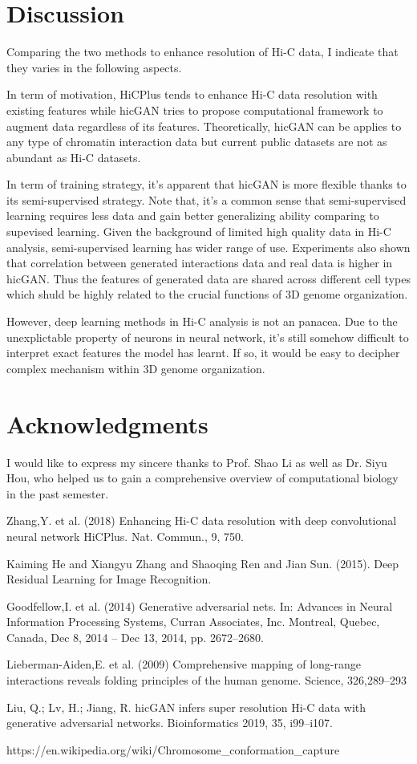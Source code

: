 \documentclass{article}
\begin{document}
\section{Discussion}
Comparing the two methods to enhance resolution of Hi-C data, I indicate that they varies in the following aspects. 

In term of motivation, HiCPlus tends to enhance Hi-C data resolution with existing features while hicGAN tries to propose computational framework to augment data regardless of its features. Theoretically, hicGAN can be applies to any type of chromatin interaction data but current public datasets are not as abundant as Hi-C datasets.

In term of training strategy, it's apparent that hicGAN is more flexible thanks to its semi-supervised strategy. Note that, it's a common sense that semi-supervised learning requires less data and gain better generalizing ability comparing to supevised learning. Given the background of limited high quality data in Hi-C analysis, semi-supervised learning has wider range of use.
Experiments also shown that correlation between generated interactions data and real data is higher in hicGAN. Thus the features of generated data are shared across different cell types which shuld be highly related to the crucial functions of 3D genome organization.

However, deep learning methods in Hi-C analysis is not an panacea. Due to the unexplictable property of neurons in neural network, it's still somehow difficult to interpret exact features the model has learnt. If so, it would be easy to decipher complex mechanism within 3D genome organization.

\section*{Acknowledgments}
I would like to express my sincere thanks to Prof. Shao Li as well as Dr. Siyu Hou, who helped us to gain a comprehensive overview of computational biology in the past semester.

\begin{thebibliography}{99}
    Zhang,Y. et al. (2018) Enhancing Hi-C data resolution with deep convolutional neural network HiCPlus. Nat. Commun., 9, 750.

    Kaiming He and Xiangyu Zhang and Shaoqing Ren and Jian Sun. (2015). Deep Residual Learning for Image Recognition.

    Goodfellow,I. et al. (2014) Generative adversarial nets. In: Advances in Neural Information Processing Systems, Curran Associates, Inc. Montreal, Quebec, Canada, Dec 8, 2014 – Dec 13, 2014, pp. 2672–2680.

    Lieberman-Aiden,E. et al. (2009) Comprehensive mapping of long-range interactions reveals folding principles of the human genome. Science, 326,289–293

    Liu, Q.; Lv, H.; Jiang, R. hicGAN infers super resolution Hi-C data with generative adversarial networks. Bioinformatics 2019, 35, i99–i107.

    https://en.wikipedia.org/wiki/Chromosome\_conformation\_capture
\end{thebibliography}
\end{document}
